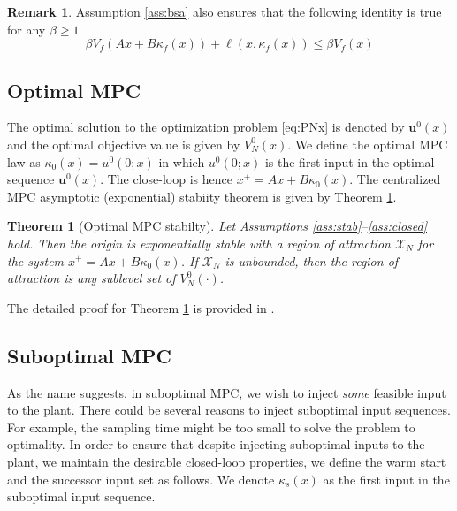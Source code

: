 \documentclass[10pt]{article}
\newcommand{\bu}{\mathbf{u}}
\newtheorem{theorem}[assumption]{Theorem}
\theoremstyle{definition}
\newtheorem{remark}[assumption]{Remark}
\begin{document}
\begin{remark}
Assumption \ref{ass:bsa} also ensures that the following identity is true for any $\beta \geq 1$
\[\beta V_f(Ax+B\kappa_f(x)) + \ell(x,\kappa_f(x)) \leq \beta
V_f(x) \]
\end{remark}
\subsection{Optimal MPC}
The optimal solution to the optimization problem \eqref{eq:PNx} is
denoted by $\bu^0(x)$ and the optimal objective value is given by
$V_N^0(x)$. We define the optimal MPC law as $\kappa_0(x) = u^0(0;x)$
in which $u^0(0;x)$ is the first input in the optimal sequence
$\bu^0(x)$. The close-loop is hence $x^+ = Ax + B\kappa_0(x)$. The
centralized MPC asymptotic (exponential) stabiity theorem \citep[Thm 2.24(b),
  Chap. 2]{rawlings:mayne:2009} is given by Theorem \ref{thm:mpc:optimal}.
\begin{theorem}[Optimal MPC stabilty]
\label{thm:mpc:optimal}
Let Assumptions \ref{ass:stab}--\ref{ass:closed} hold. Then
the origin is exponentially stable with a region of attraction
$\mathcal{X}_N$ for the system $x^+ = Ax + B\kappa_0(x)$. If
$\mathcal{X}_N$ is unbounded, then the region of attraction is any
sublevel set of $V_N^0(\cdot)$.
\end{theorem}

The detailed  proof for Theorem \ref{thm:mpc:optimal} is
provided in \citet[Chap. 2]{rawlings:mayne:2009}.

\subsection{Suboptimal MPC}
As the name suggests, in suboptimal MPC, we wish to inject {\emph{some}} feasible input
to the plant. There could be several reasons to inject suboptimal
input sequences. For example, the sampling time might be too small to
solve the problem to optimality.  In order to ensure that despite injecting suboptimal
inputs to the plant, we maintain the desirable closed-loop properties,
we define the warm start and the successor input set as follows. We
denote $\kappa_s(x)$ as the first input in the suboptimal input
sequence.
\end{document}
